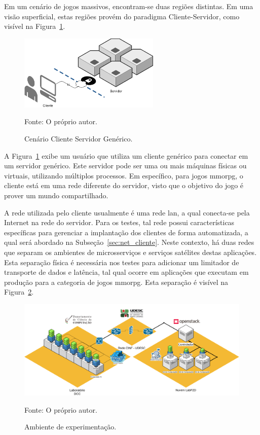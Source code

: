 Em um cenário de jogos massivos, encontram-se duas regiões distintas.
%
Em uma visão superficial, estas regiões provém do paradigma Cliente-Servidor, como visível na Figura~\ref{fig:cenario_cliente_servidor}.

\begin{figure}[htb!]
  \caption{Cenário Cliente Servidor Genérico.}
  \label{fig:cenario_cliente_servidor}
  \includegraphics[width=0.6\textwidth]{figuras/ambiente/cs.png}
  \centering

  Fonte: O próprio autor.
\end{figure}



A Figura~\ref{fig:cenario_cliente_servidor} exibe um usuário que utiliza um cliente genérico para conectar em um servidor genérico.
%
Este servidor pode ser uma ou mais máquinas físicas ou virtuais, utilizando múltiplos processos.
%
Em específico, para jogos \ac{mmorpg}, o cliente está em uma rede diferente do servidor, visto que o objetivo do jogo é prover um mundo compartilhado.

A rede utilizada pelo cliente usualmente é uma rede \ac{lan}, a qual conecta-se pela Internet na rede do servidor.
%
Para os testes, tal rede possui características específicas para gerenciar a implantação dos clientes de forma automatizada, a qual será abordado na Subseção~\ref{sec:net_cliente}.
%
Neste contexto, há duas redes que separam os ambientes de microsserviços e serviços satélites destas aplicações.
%
Esta separação física é necessária nos testes para adicionar um limitador de transporte de dados e latência, tal qual ocorre em aplicações que executam em produção para a categoria de jogos \ac{mmorpg}.
%
Esta separação é visível na Figura~\ref{fig:net_completa}.

  \vspace{-0.3cm}
\begin{figure}[htb!]
  \caption{Ambiente de experimentação.}
    \vspace{-0.3cm}
  \label{fig:net_completa}
  \includegraphics[width=.9\textwidth]{figuras/ambiente/full.png}
  \centering

  Fonte: O próprio autor.
\end{figure}

